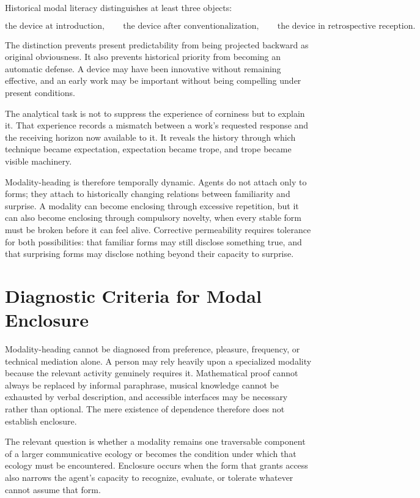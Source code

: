 \documentclass[11pt]{article}
\begin{document}
Historical modal literacy distinguishes at least three objects:

\begin{equation}
  \text{the device at introduction},
  \qquad
  \text{the device after conventionalization},
  \qquad
  \text{the device in retrospective reception}.
  \label{eq:historical-device}
\end{equation}

The distinction prevents present predictability from being projected backward
as original obviousness. It also prevents historical priority from becoming
an automatic defense. A device may have been innovative without remaining
effective, and an early work may be important without being compelling under
present conditions.

The analytical task is not to suppress the experience of corniness but to
explain it. That experience records a mismatch between a work's requested
response and the receiving horizon now available to it. It reveals the
history through which technique became expectation, expectation became trope,
and trope became visible machinery.

Modality-heading is therefore temporally dynamic. Agents do not attach only to
forms; they attach to historically changing relations between familiarity and
surprise. A modality can become enclosing through excessive repetition, but
it can also become enclosing through compulsory novelty, when every stable
form must be broken before it can feel alive. Corrective permeability requires
tolerance for both possibilities: that familiar forms may still disclose
something true, and that surprising forms may disclose nothing beyond their
capacity to surprise.

\section{Diagnostic Criteria for Modal Enclosure}

Modality-heading cannot be diagnosed from preference, pleasure, frequency, or
technical mediation alone. A person may rely heavily upon a specialized
modality because the relevant activity genuinely requires it. Mathematical
proof cannot always be replaced by informal paraphrase, musical knowledge
cannot be exhausted by verbal description, and accessible interfaces may be
necessary rather than optional. The mere existence of dependence therefore
does not establish enclosure.

The relevant question is whether a modality remains one traversable component
of a larger communicative ecology or becomes the condition under which that
ecology must be encountered. Enclosure occurs when the form that grants access
also narrows the agent's capacity to recognize, evaluate, or tolerate whatever
cannot assume that form.
\end{document}
